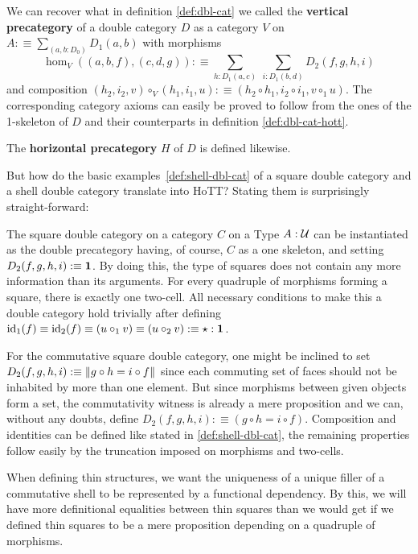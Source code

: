 \begin{defn}
We can recover what in definition \ref{def:dbl-cat} we called the \textbf{vertical
precategory} of a double category $D$ as a category $V$ on $A :\equiv
\sum_{(a,b : D_0)} D_1(a,b)$ with morphisms
\begin{equation*}
\hom_V((a,b,f),(c,d,g)) :\equiv \sum_{h:D_1(a,c)} ~ \sum_{i:D_1(b,d)} D_2(f,g,h,i)
\end{equation*}
and composition $(h_2,i_2,v) \circ_V (h_1,i_1,u) :\equiv
(h_2 \circ h_1, i_2 \circ i_1, v \circ_1 u)$.
The corresponding category axioms can easily be proved to follow from the ones
of the 1-skeleton of $D$ and their counterparts in definition \ref{def:dbl-cat-hott}.

The \textbf{horizontal precategory} $H$ of $D$ is defined likewise.
\end{defn}

But how do the basic examples~\ref{def:shell-dbl-cat} of a square double category
and a shell double category translate into HoTT? Stating them is surprisingly
straight-forward:

\begin{example} \label{def:shell-dbl-cat-hott}
The square double category on a category $C$ on a Type $A : \mathcal{U}$ can be instantiated
as the double precategory having, of course, $C$ as a one skeleton, and setting
$D_2(f,g,h,i) :\equiv \mathbf{1}$.
By doing this, the type of squares does not contain any more information than its
arguments.
For every quadruple of morphisms forming a square, there is exactly one two-cell.
All necessary conditions to make this a double category hold trivially after
defining $\operatorname{id}_1(f) \equiv \operatorname{id}_2(f) \equiv (u \circ_1 v) \equiv (u \circ_2 v) :\equiv
\star : \mathbf{1}$.

For the commutative square double category, one might be inclined to set
$D_2(f,g,h,i) :\equiv \left\Vert g \circ h = i \circ f\right\Vert_{}$ since each commuting
set of faces should not be inhabited by more than one element.
But since morphisms between given objects form a set, the commutativity witness
is already a mere proposition and we can, without any doubts, define
$D_2(f,g,h,i) :\equiv (g \circ h = i \circ f)$.
Composition and identities can be defined like stated in \ref{def:shell-dbl-cat},
the remaining properties follow easily by the truncation imposed on morphisms
and two-cells.
\end{example}

When defining thin structures, we want the uniqueness of a unique filler of a
commutative shell to be represented by a functional dependency.
By this, we will have more definitional equalities between thin squares than
we would get if we defined thin squares to be a mere proposition depending on
a quadruple of morphisms.

